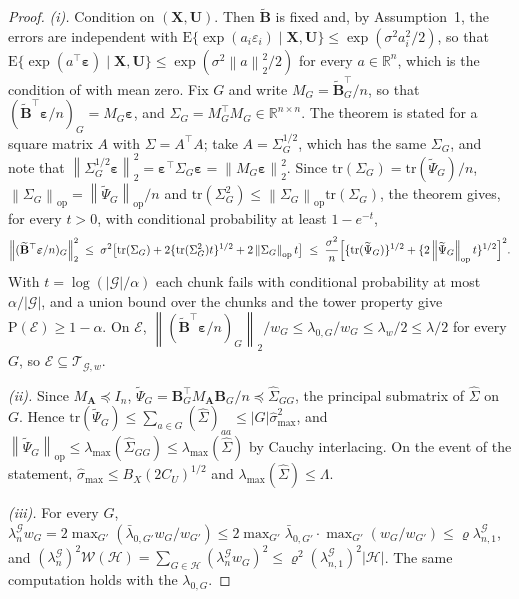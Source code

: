 \documentclass[10pt]{book}
\theoremstyle{definition}
\newcommand{\R}{\mathbb{R}}
\newcommand{\E}{\mathrm{E}}
\newcommand{\Prob}{\mathrm{P}}
\newcommand{\T}{^{\top}}
\newcommand{\norm}[1]{\left\lVert #1 \right\rVert}
\newcommand{\bX}{\mathbf{X}}
\newcommand{\bU}{\mathbf{U}}
\newcommand{\Gramhat}{\widehat{\Sigma}}
\newcommand{\pen}{\lambda}
\newcommand{\Amat}{\mathbf{A}}
\newcommand{\Bmat}{\mathbf{B}}
\newcommand{\Btil}{\widetilde{\Bmat}}
\newcommand{\MA}{M_{\Amat}}
\newcommand{\bveps}{\boldsymbol{\varepsilon}}
\newcommand{\smax}{\widehat{\sigma}_{\max}}
\newcommand{\lmaxx}{\lambda_{\max}}
\newcommand{\opnorm}[1]{\left\lVert #1 \right\rVert_{\mathrm{op}}}
\newcommand{\Gcal}{\mathcal{G}}
\newcommand{\Hcal}{\mathcal{H}}
\newcommand{\Wcal}{\mathcal{W}}
\newcommand{\Psitil}{\widetilde{\Psi}}
\newcommand{\lamG}{\lambda^{\mathcal{G}}_{n}}
\newcommand{\lamGone}{\lambda^{\mathcal{G}}_{n,1}}
\newcommand{\lamz}[1]{\lambda_{0,#1}}
\newcommand{\lamzbar}[1]{\bar{\lambda}_{0,#1}}
\newcommand{\Tw}{\mathcal{T}_{\mathcal{G},w}}
\newcommand{\Ecal}{\mathcal{E}}
\begin{document}
{\begin{proof}
\emph{(i).} Condition on $(\bX,\bU)$. Then $\Btil$ is fixed and, by
Assumption~1, the errors are independent with
$\E\{\exp(a_{i}\varepsilon_{i})\mid\bX,\bU\} \le \exp(\sigma^{2}a_{i}^{2}/2)$,
so that $\E\{\exp(a\T\bveps)\mid\bX,\bU\} \le \exp(\sigma^{2}\norm{a}_{2}^{2}/2)$
for every $a \in \R^{n}$, which is the condition of
\citet[Theorem~2.1]{Hsu-Kakade-Zhang-2012} with mean zero. Fix $G$ and write
$M_{G} = \Btil_{G}\T/n$, so that $(\Btil\T\bveps/n)_{G} = M_{G}\bveps$, and
$\Sigma_{G} = M_{G}\T M_{G} \in \R^{n\times n}$. The theorem is stated for a
square matrix $A$ with $\Sigma = A\T A$; take $A = \Sigma_{G}^{1/2}$, which has
the same $\Sigma_{G}$, and note that
$\norm{\Sigma_{G}^{1/2}\bveps}_{2}^{2} = \bveps\T\Sigma_{G}\bveps =
\norm{M_{G}\bveps}_{2}^{2}$. Since $\mathrm{tr}(\Sigma_{G}) =
\mathrm{tr}(\Psitil_{G})/n$, $\opnorm{\Sigma_{G}} = \opnorm{\Psitil_{G}}/n$
and $\mathrm{tr}(\Sigma_{G}^{2}) \le \opnorm{\Sigma_{G}}\mathrm{tr}(\Sigma_{G})$,
the theorem gives, for every $t > 0$, with conditional probability at least
$1 - e^{-t}$,
\[
  \norm{(\Btil\T\bveps/n)_{G}}_{2}^{2}
  \;\le\; \sigma^{2}\bigl[\mathrm{tr}(\Sigma_{G})
  + 2\{\mathrm{tr}(\Sigma_{G}^{2})t\}^{1/2} + 2\opnorm{\Sigma_{G}}t\bigr]
  \;\le\; \frac{\sigma^{2}}{n}\Bigl[\{\mathrm{tr}(\Psitil_{G})\}^{1/2}
  + \{2\opnorm{\Psitil_{G}}t\}^{1/2}\Bigr]^{2}.
\]
With $t = \log(|\Gcal|/\alpha)$ each chunk fails with conditional probability
at most $\alpha/|\Gcal|$, and a union bound over the chunks and the tower
property give $\Prob(\Ecal) \ge 1-\alpha$. On $\Ecal$,
$\norm{(\Btil\T\bveps/n)_{G}}_{2}/w_{G} \le \lamz{G}/w_{G} \le \pen_{w}/2 \le
\pen/2$ for every $G$, so $\Ecal \subseteq \Tw$.

\emph{(ii).} Since $\MA \preceq I_{n}$,
$\Psitil_{G} = \Bmat_{G}\T\MA\Bmat_{G}/n \preceq \Gramhat_{GG}$, the principal
submatrix of $\Gramhat$ on $G$. Hence $\mathrm{tr}(\Psitil_{G}) \le
\sum_{a\in G}(\Gramhat)_{aa} \le |G|\smax^{2}$, and
$\opnorm{\Psitil_{G}} \le \lmaxx(\Gramhat_{GG}) \le \lmaxx(\Gramhat)$ by Cauchy
interlacing. On the event of the statement,
$\smax \le B_X(2C_U)^{1/2}$ and $\lmaxx(\Gramhat) \le \Lambda$.

\emph{(iii).} For every $G$,
$\lamG w_{G} = 2\max_{G'}(\lamzbar{G'}w_{G}/w_{G'}) \le
2\max_{G'}\lamzbar{G'}\cdot\max_{G'}(w_{G}/w_{G'}) \le \varrho\lamGone$, and
$(\lamG)^{2}\Wcal(\Hcal) = \sum_{G\in\Hcal}(\lamG w_{G})^{2} \le
\varrho^{2}(\lamGone)^{2}|\Hcal|$. The same computation holds with the
$\lamz{G}$.
\end{proof}
}
\end{document}
